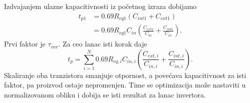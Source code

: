 Izdvajanjem ulazne kapacitivnosti iz početnog izraza dobijamo
\[\begin{aligned}
t_{p1}&=0.69R_{eq1}(C_{int1}+C_{ext1})\\
&=0.69R_{eq1}C_{in}\left(\frac{C_{ext1}}{C_{in}}+\frac{C_{int1}}{C_{in}}\right).
\end{aligned}\]
Prvi faktor je $\tau_{inv}$. Za ceo lanac isti korak daje
\[t_p=\sum_{i=1}^N0.69R_{eq,i}C_{in,i}
\left(\frac{C_{ext,i}}{C_{in,i}}+\frac{C_{int,i}}{C_{in,i}}\right).
\]
Skaliranje oba tranzistora smanjuje otpornost, a povećava kapacitivnost za isti faktor, pa proizvod ostaje nepromenjen. Time se optimizacija može nastaviti u normalizovanom obliku i dobija se isti rezultat za lanac invertora.

